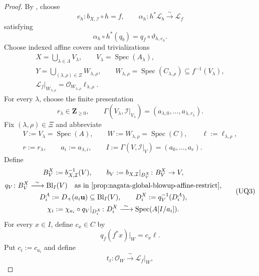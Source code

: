 \begin{proof}
  By , choose
  \[
    e_h\colon b_{X,\mathcal I}\circ h=f,
    \qquad
    \alpha_h\colon h^*\mathcal L_b\xrightarrow{\sim}\mathcal L_f
  \]
  satisfying
  \[
    \alpha_h\circ h^*(q_b)=q_f\circ\vartheta_{h,e_h}.          \tag{UP3}
  \]
  Choose indexed affine covers and trivializations
  \[
  \begin{gathered}
    X=\bigcup_{\lambda\in\Lambda}V_\lambda,\qquad
    V_\lambda=\operatorname{Spec}(A_\lambda),\\
    Y=\bigcup_{(\lambda,\rho)\in\Xi}W_{\lambda,\rho},\qquad
    W_{\lambda,\rho}=\operatorname{Spec}(C_{\lambda,\rho})
      \subseteq f^{-1}(V_\lambda),\\
    \mathcal L_f|_{W_{\lambda,\rho}}
      =\mathcal O_{W_{\lambda,\rho}}\ell_{\lambda,\rho}.
  \end{gathered}                                               \tag{UQ0}
  \]
  For every $\lambda$, choose the finite presentation
  \[
    r_\lambda\in\mathbf Z_{\ge0},\qquad
    \Gamma(V_\lambda,\mathcal I|_{V_\lambda})
      =(a_{\lambda,0},\ldots,a_{\lambda,r_\lambda}).           \tag{UQ1}
  \]
  Fix $(\lambda,\rho)\in\Xi$ and abbreviate
  \[
  \begin{gathered}
    V:=V_\lambda=\operatorname{Spec}(A),\qquad
    W:=W_{\lambda,\rho}=\operatorname{Spec}(C),\qquad
    \ell:=\ell_{\lambda,\rho},\\
    r:=r_\lambda,\qquad a_i:=a_{\lambda,i},\qquad
    I:=\Gamma(V,\mathcal I|_V)=(a_0,\ldots,a_r).
  \end{gathered}                                               \tag{UQ2}
  \]
  Define
  \[
  \begin{gathered}
    B_V^X:=b_{X,\mathcal I}^{-1}(V),\qquad
    b_V:=b_{X,\mathcal I}|_{B_V^X}\colon B_V^X\to V,\\
    q_V\colon B_V^X\xrightarrow{\ \sim\ }\operatorname{Bl}_I(V)
      \quad\text{as in
      \Cref{prop:nagata-global-blowup-affine-restrict}},\\
    D_i^A:=D_+(a_i\mathbf u)\subseteq\operatorname{Bl}_I(V),
    \qquad D_i^X:=q_V^{-1}(D_i^A),\\
    \chi_i:=\chi_{a_i}\circ q_V|_{D_i^X}\colon
      D_i^X\xrightarrow{\ \sim\ }\operatorname{Spec}(A[I/a_i]).
  \end{gathered}                                               \tag{UQ3}
  \]
  For every $x\in I$, define $c_x\in C$ by
  \[
    q_f(f^*x)|_W=c_x\ell.
  \]
  Put $c_i:=c_{a_i}$ and define
  \[
    t_\ell\colon\mathcal O_W\xrightarrow{\ \sim\ }\mathcal L_f|_W,
\]
\end{proof}
